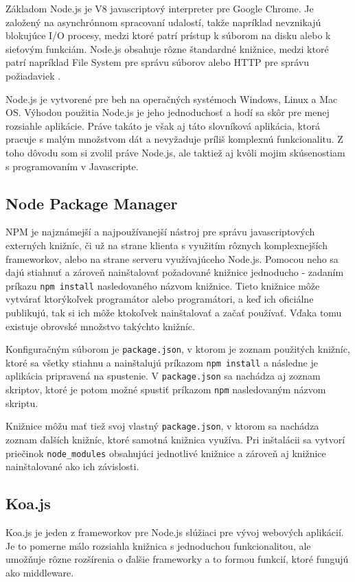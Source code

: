 \documentclass[
  digital, %
  table,   %
  lof,     %
  lot,     %
]{fithesis3}
\begin{document}
Základom Node.js je V8 javascriptový interpreter pre Google Chrome. Je založený na asynchrónnom spracovaní udalostí, takže napríklad nevznikajú blokujúce I/O procesy, medzi ktoré patrí prístup k súborom na disku alebo k sieťovým funkciám. Node.js obsahuje rôzne štandardné knižnice, medzi ktoré patrí napríklad File System pre správu súborov alebo HTTP pre správu požiadaviek \parencite{krause2017introduction}.

Node.js je vytvorené pre beh na operačných systémoch Windows, Linux a Mac OS. Výhodou použitia Node.js je jeho jednoduchosť a hodí sa skôr pre menej rozsiahle aplikácie. Práve takáto je však aj táto slovníková aplikácia, ktorá pracuje s malým množstvom dát a nevyžaduje príliš komplexnú funkcionalitu. Z toho dôvodu som si zvolil práve Node.js, ale taktiež aj kvôli mojim skúsenostiam s programovaním v Javascripte.

\subsection{Node Package Manager}
NPM je najznámejší a najpoužívanejší nástroj pre správu javascriptových externých knižníc, či už na strane klienta s využitím rôznych komplexnejších frameworkov, alebo na strane serveru využívajúceho Node.js. Pomocou neho sa dajú stiahnuť a zároveň nainštalovať požadované knižnice jednoducho - zadaním príkazu \texttt{npm install} nasledovaného názvom knižnice. Tieto knižnice môže vytvárať ktorýkoľvek programátor alebo programátori, a keď ich oficiálne publikujú, tak si ich môže ktokoľvek nainštalovať a začať používať. Vďaka tomu existuje obrovské množstvo takýchto knižníc.

Konfiguračným súborom je \texttt{package.json}, v ktorom je zoznam použitých knižníc, ktoré sa všetky stiahnu a nainštalujú príkazom \texttt{npm install} a následne je aplikácia pripravená na spustenie. V \texttt{package.json} sa nachádza aj zoznam skriptov, ktoré je potom možné spustiť príkazom \texttt{npm} nasledovaným názvom skriptu.

Knižnice môžu mať tiež svoj vlastný \texttt{package.json}, v ktorom sa nachádza zoznam ďalších knižníc, ktoré samotná knižnica využíva. Pri inštalácii sa vytvorí priečinok \texttt{node\_modules} obsahujúci jednotlivé knižnice a zároveň aj knižnice nainštalované ako ich závislosti.

\subsection{Koa.js}
Koa.js je jeden z frameworkov pre Node.js slúžiaci pre vývoj webových aplikácií. Je to pomerne málo rozsiahla knižnica s jednoduchou funkcionalitou, ale umožňuje rôzne rozšírenia o ďalšie frameworky a to formou funkcií, ktoré fungujú ako middleware. 
\end{document}
